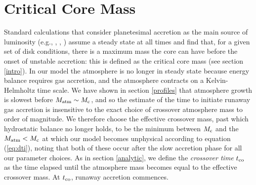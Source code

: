 \documentclass[apj]{emulateapj}
\begin{document}
\section{Critical Core Mass}
\label{critical}



Standard calculations that consider planetesimal accretion as the main source of luminosity (e.g., \citealt{mizuno78}, \citealt{stevenson82}, \citealt{rafikov06}) assume a steady state at all times and find that, for a given set of disk conditions, there is a maximum mass the core can have before the onset of unstable accretion: this is defined as the critical core mass (see section \ref{intro}). In our model the atmosphere is no longer in steady state because energy balance requires gas accretion, and the atmosphere contracts on a Kelvin-Helmholtz time scale. We have shown in section \ref{profiles} that atmosphere growth is slowest before $M_{\rm{atm}} \sim M_{\rm c}$, and so the estimate of the time to initiate runaway gas accretion is insensitive to the exact choice of crossover atmosphere mass to order of magnitude. We therefore choose the effective crossover mass, past which hydrostatic balance no longer holds, to be the minimum between $M_{\rm{c}}$ and the $M_{\rm{atm}}<M_{\rm c}$ at which our model becomes unphysical according to equation (\ref{eq:dti}), noting that both of these occur after the slow accretion phase for all our parameter choices. As in section \ref{analytic}, we define the \textit{crossover time} $t_{\rm{co}}$ as the time elapsed until the atmosphere mass becomes equal to the effective crossover mass. At $t_{\rm{co}}$, runaway accretion commences.
\end{document}
